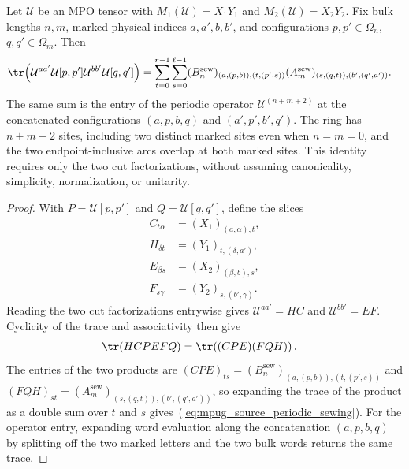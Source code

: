 \begin{lemma}
    \label{thm:mpug_source_periodic_sewing}
    \leanok
    Let $\mathcal U$ be an MPO tensor with $M_1(\mathcal U)=X_1Y_1$ and
    $M_2(\mathcal U)=X_2Y_2$. Fix bulk lengths $n,m$, marked physical
    indices $a,a',b,b'$, and configurations $p,p'\in\Omega_n$,
    $q,q'\in\Omega_m$. Then
    \begin{align}
        \tr\!\left(\mathcal U^{aa'}\mathcal U[p,p']
        \mathcal U^{bb'}\mathcal U[q,q']\right)
         & =\sum_{t=0}^{r-1}\sum_{s=0}^{\ell-1}
        (B^{\mathrm{sew}}_n)_{(a,(p,b)),(t,(p',s))}
        (A^{\mathrm{sew}}_m)_{(s,(q,t)),(b',(q',a'))}.
        \label{eq:mpug_source_periodic_sewing}
    \end{align}
    The same sum is the entry of the periodic operator
    $\mathcal U^{(n+m+2)}$ at the concatenated configurations
    $(a,p,b,q)$ and $(a',p',b',q')$. The ring has $n+m+2$ sites, including
    two distinct marked sites even when $n=m=0$, and the two
    endpoint-inclusive arcs overlap at both marked sites. This identity
    requires only the two cut factorizations, without assuming canonicality,
    simplicity, normalization, or unitarity.
\end{lemma}
\begin{proof}\leanok
    With $P=\mathcal U[p,p']$ and $Q=\mathcal U[q,q']$, define the slices
    \begin{align}
        C_{t\alpha}  & =(X_1)_{(a,\alpha),t},  \\
        H_{\delta t} & =(Y_1)_{t,(\delta,a')}, \\
        E_{\beta s}  & =(X_2)_{(\beta,b),s},   \\
        F_{s\gamma}  & =(Y_2)_{s,(b',\gamma)}.
    \end{align}
    Reading the two cut factorizations entrywise gives
    $\mathcal U^{aa'}=HC$ and $\mathcal U^{bb'}=EF$. Cyclicity of the
    trace and associativity then give
    \begin{align}
        \tr\!\left(HCPEFQ\right)
         & =\tr\!\left((CPE)(FQH)\right).
    \end{align}
    The entries of the two products are
    $(CPE)_{ts}=(B^{\mathrm{sew}}_n)_{(a,(p,b)),(t,(p',s))}$ and
    $(FQH)_{st}=(A^{\mathrm{sew}}_m)_{(s,(q,t)),(b',(q',a'))}$, so
    expanding the trace of the product as a double sum over $t$ and $s$
    gives~(\ref{eq:mpug_source_periodic_sewing}). For the operator entry,
    expanding word evaluation along the concatenation $(a,p,b,q)$ by
    splitting off the two marked letters and the two bulk words returns the
    same trace.
\end{proof}

